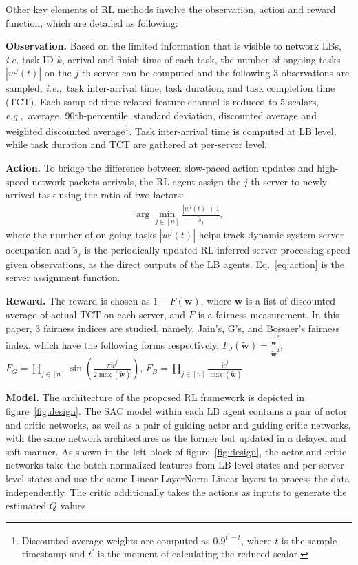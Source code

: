 \documentclass{article}
\newcommand{\ie}{\textit{i.e.},\ }
\newcommand{\eg}{\textit{e.g.},\ }
\begin{document}
Other key elements of RL methods involve the observation, action and reward function, which are detailed as following:

\textbf{Observation.} Based on the limited information that is visible to network LBs, \textit{i.e.} task ID $k$, arrival and finish time of each task, the number of ongoing tasks $|w^j(t)|$ on the $j$-th server can be computed and the following $3$ observations are sampled, \ie task inter-arrival time, task duration, and task completion time (TCT).
Each sampled time-related feature channel is reduced to 5 scalars, \eg average, 90th-percentile, standard deviation, discounted average and weighted discounted average\footnote{Discounted average weights are computed as $0.9^{t^\prime-t}$, where $t$ is the sample timestamp and $t^\prime$ is the moment of calculating the reduced scalar.}.
Task inter-arrival time is computed at LB level, while task duration and TCT are gathered at per-server level.

\textbf{Action.} To bridge the difference between slow-paced action updates and high-speed network packets arrivals, the RL agent assign the $j$-th server to newly arrived task using the ratio of two factors:
\begin{align}
\arg \min_{j\in[n]} \frac{|w^j(t)|+1}{\tilde{s}_j},
\label{eq:action}
\end{align}
where the number of on-going tasks $|w^j(t)|$ helps track dynamic system server occupation and $\tilde{s}_j$ is the periodically updated RL-inferred server processing speed given observations, as the direct outputs of the LB agents. Eq.~\eqref{eq:action} is the server assignment function.

\textbf{Reward.} The reward is chosen as $1-F(\mathbf{\tilde{w}})$, where $\mathbf{\tilde{w}}$ is a list of discounted average of actual TCT on each server, and $F$ is a fairness measurement.
In this paper, $3$ fairness indices are studied, namely, Jain's, G's, and Bossaer's fairness index, which have the following forms respectively, $F_J(\mathbf{\tilde{w}}) = \frac{\overline{\mathbf{\tilde{w}}}^2}{\overline{\mathbf{\tilde{w}}^2}}$, $F_G = \prod_{j \in [n]}\sin(\frac{\pi\tilde{w}^j}{2\max(\mathbf{\tilde{w}})})$, $F_B = \prod_{j \in [n]}\frac{\tilde{w}^j}{\max(\mathbf{\tilde{w}})}$.

\textbf{Model.} The architecture of the proposed RL framework is depicted in figure~\ref{fig:design}. The SAC model within each LB agent contains a pair of actor and critic networks, as well as a pair of guiding actor and guiding critic networks, with the same network architectures as the former but updated in a delayed and soft manner. As shown in the left block of figure~\ref{fig:design}, the actor and critic networks take the batch-normalized features from LB-level states and per-server-level states and use the same Linear-LayerNorm-Linear layers to process the data independently. The critic additionally takes the actions as inputs to generate the estimated $Q$ values.
\end{document}

